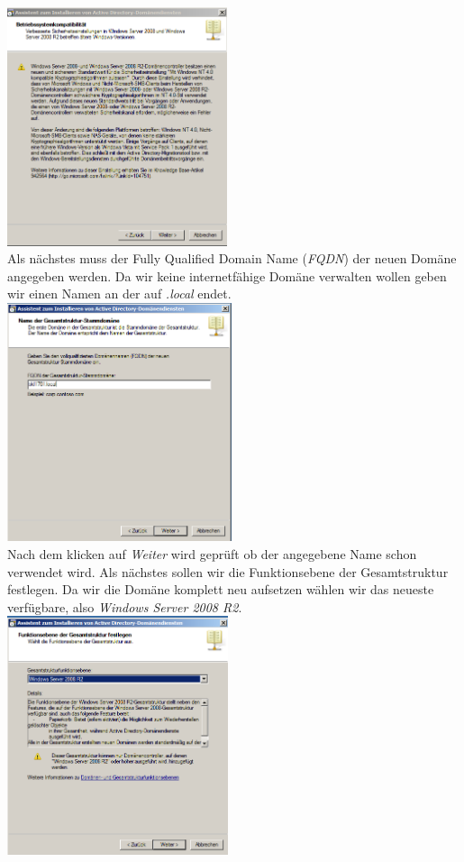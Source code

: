 \documentclass[12pt,a4paper,titlepage]{article} %
\begin{document}
	\includegraphics[height=7cm]{Bilder/015(dcpromo_exe02)}\\
	
Als nächstes muss der Fully Qualified Domain Name (\emph{FQDN}) der neuen Domäne angegeben werden. Da wir keine internetfähige Domäne verwalten wollen geben wir einen Namen an der auf \emph{.local} endet.\\

	\includegraphics[height=7cm]{Bilder/017(dcpromo_exe04)}\\
		
Nach dem klicken auf \emph{Weiter} wird geprüft ob der angegebene Name schon verwendet wird. Als nächstes sollen wir die Funktionsebene der Gesamtstruktur festlegen. Da wir die Domäne komplett neu aufsetzen wählen wir das neueste verfügbare, also \emph{Windows Server 2008 R2}.\\

	\includegraphics[height=7cm]{Bilder/019(dcpromo_exe06)}\\
	
\end{document}
